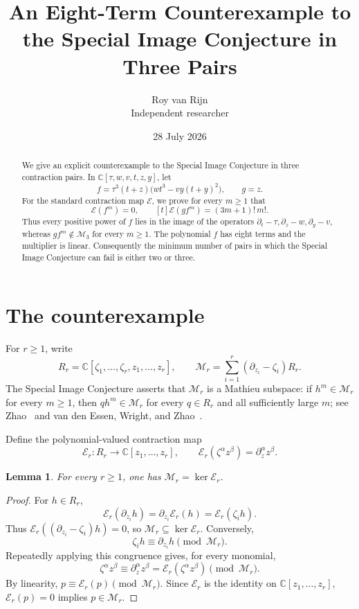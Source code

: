 \documentclass[11pt]{article}
\title{An Eight-Term Counterexample to the Special Image Conjecture
  in Three Pairs}
\author{Roy van Rijn\\{\small Independent researcher}}
\date{28 July 2026}
\newtheorem{lemma}[theorem]{Lemma}
\newcommand{\C}{\mathbb C}
\newcommand{\Eop}{\mathcal E}
\newcommand{\M}{\mathcal M}
\begin{document}
\maketitle

\begin{abstract}
We give an explicit counterexample to the Special Image Conjecture in
three contraction pairs.  In
\(\C[\tau,w,v,t,z,y]\), let
\[
 f=\tau^3(t+z)\bigl(wt^3-vy(t+y)^2\bigr),\qquad g=z.
\]
For the standard contraction map \(\Eop\), we prove for every \(m\geq1\)
that
\[
 \Eop(f^m)=0,\qquad [t]\Eop(gf^m)=(3m+1)!\,m!.
\]
Thus every positive power of \(f\) lies in the image of the operators
\(\partial_t-\tau,\partial_z-w,\partial_y-v\), whereas
\(gf^m\notin\M_3\) for every \(m\geq1\).  The polynomial \(f\) has
eight terms and the multiplier is linear.
Consequently the minimum number of pairs in which the Special Image
Conjecture can fail is either two or three.
\end{abstract}

\section{The counterexample}

For \(r\geq1\), write
\[
 R_r=\C[\zeta_1,\ldots,\zeta_r,z_1,\ldots,z_r],
 \qquad
 \M_r=\sum_{i=1}^r(\partial_{z_i}-\zeta_i)R_r.
\]
The Special Image Conjecture asserts that \(\M_r\) is a Mathieu
subspace: if \(h^m\in\M_r\) for every \(m\geq1\), then
\(qh^m\in\M_r\) for every \(q\in R_r\) and all sufficiently large
\(m\); see Zhao~\cite{Zhao2010} and van den Essen, Wright, and
Zhao~\cite{EWZ2011}.

Define the polynomial-valued contraction map
\[
 \Eop_r:R_r\longrightarrow\C[z_1,\ldots,z_r],
 \qquad
 \Eop_r(\zeta^\alpha z^\beta)=\partial_z^\alpha z^\beta.
\]

\begin{lemma}\label{lem:kernel}
For every \(r\geq1\), one has \(\M_r=\ker\Eop_r\).
\end{lemma}

\begin{proof}
For \(h\in R_r\),
\[
 \Eop_r(\partial_{z_i}h)
 =\partial_{z_i}\Eop_r(h)
 =\Eop_r(\zeta_i h).
\]
Thus \(\Eop_r((\partial_{z_i}-\zeta_i)h)=0\), so
\(\M_r\subseteq\ker\Eop_r\).  Conversely,
\[
 \zeta_i h\equiv\partial_{z_i}h\pmod{\M_r}.
\]
Repeatedly applying this congruence gives, for every monomial,
\[
 \zeta^\alpha z^\beta
 \equiv\partial_z^\alpha z^\beta
 =\Eop_r(\zeta^\alpha z^\beta)
 \pmod{\M_r}.
\]
By linearity, \(p\equiv\Eop_r(p)\pmod{\M_r}\).  Since \(\Eop_r\) is
the identity on \(\C[z_1,\ldots,z_r]\), \(\Eop_r(p)=0\) implies
\(p\in\M_r\).
\end{proof}
\end{document}
